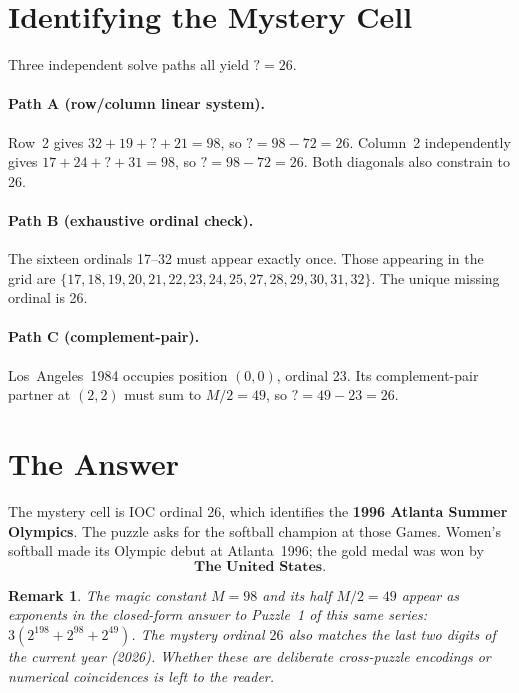 \documentclass{article}
\newtheorem{remark}[theorem]{Remark}
\begin{document}
\section{Identifying the Mystery Cell}
\label{sec:mystery}

Three independent solve paths all yield $? = 26$.

\paragraph{Path A (row/column linear system).}
Row~2 gives $32 + 19 + ? + 21 = 98$, so $? = 98 - 72 = 26$.
Column~2 independently gives $17 + 24 + ? + 31 = 98$, so
$? = 98 - 72 = 26$.  Both diagonals also constrain to 26.

\paragraph{Path B (exhaustive ordinal check).}
The sixteen ordinals 17--32 must appear exactly once.
Those appearing in the grid are
$\{17,18,19,20,21,22,23,24,25,27,28,29,30,31,32\}$.
The unique missing ordinal is 26.

\paragraph{Path C (complement-pair).}
Los~Angeles~1984 occupies position $(0,0)$, ordinal 23.
Its complement-pair partner at $(2,2)$ must sum to $M/2=49$,
so $? = 49 - 23 = 26$.

\section{The Answer}
\label{sec:answer}

The mystery cell is IOC ordinal 26, which identifies the
\textbf{1996 Atlanta Summer Olympics}.  The puzzle asks for the
softball champion at those Games.  Women's softball made its
Olympic debut at Atlanta~1996; the gold medal was won by
\[
  \boxed{\textbf{The United States.}}
\]

\begin{remark}
  The magic constant $M = 98$ and its half $M/2 = 49$ appear
  as exponents in the closed-form answer to Puzzle~1 of this
  same series: $3(2^{198} + 2^{98} + 2^{49})$.
  The mystery ordinal $26$ also matches the last two digits of
  the current year (2026).
  Whether these are deliberate cross-puzzle encodings or numerical
  coincidences is left to the reader.
\end{remark}
\end{document}
